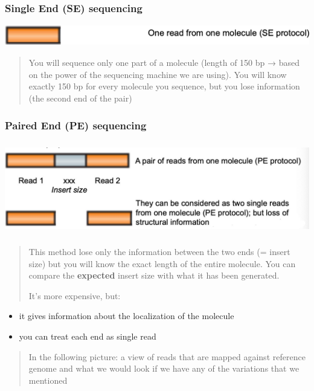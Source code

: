 \hypertarget{single-end-se-sequencing}{%
\subsubsection{Single End (SE)
sequencing}\label{single-end-se-sequencing}}

\includegraphics[width=5.64649in,height=0.35833in]{image11.png}

\begin{quote}
You will sequence only one part of a molecule (length of 150 bp
→ based on the power of the sequencing machine we are using). You will
know exactly 150 bp for every molecule you sequence, but you lose
information (the second end of the pair)
\end{quote}

\hypertarget{paired-end-pe-sequencing}{%
\subsubsection{Paired End (PE)
sequencing}\label{paired-end-pe-sequencing}}

\includegraphics[width=5.97751in,height=1.60125in]{image12.jpeg}

\begin{quote}
This method lose only the information between the two ends (= insert
size) but you will know the exact length of the entire molecule. You can
compare the \textbf{expected} insert size with what it has been
generated.

It's more expensive, but:
\end{quote}

\begin{itemize}
\item
  it gives information about the localization of the molecule
\item
  you can treat each end as single read
\end{itemize}

\begin{quote}
In the following picture: a view of reads that are mapped against
reference genome and what we would look if we have any of the variations
that we mentioned
\end{quote}


